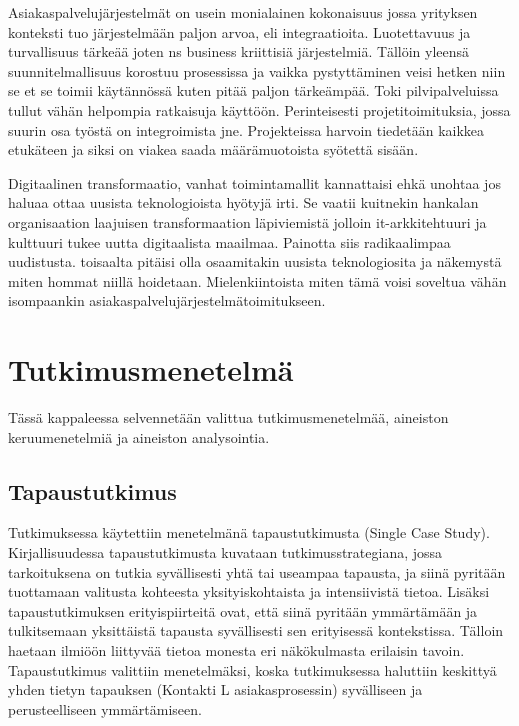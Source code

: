 \documentclass[finnish,12pt,a4paper,pdftex]{article}
\begin{document}
Asiakaspalvelujärjestelmät on usein monialainen kokonaisuus jossa yrityksen konteksti tuo järjestelmään paljon arvoa, eli integraatioita. Luotettavuus ja turvallisuus tärkeää joten ns business kriittisiä järjestelmiä. Tällöin yleensä suunnitelmallisuus korostuu prosessissa ja vaikka pystyttäminen veisi hetken niin se et se toimii käytännössä kuten pitää paljon tärkeämpää. Toki pilvipalveluissa tullut vähän helpompia ratkaisuja käyttöön. Perinteisesti projetitoimituksia, jossa suurin osa työstä on integroimista jne. Projekteissa harvoin tiedetään kaikkea etukäteen ja siksi on viakea saada määrämuotoista syötettä sisään.

Digitaalinen transformaatio, vanhat toimintamallit kannattaisi ehkä unohtaa jos haluaa ottaa uusista teknologioista hyötyjä irti. Se vaatii kuitnekin hankalan organisaation laajuisen transformaation läpiviemistä jolloin it-arkkitehtuuri ja kulttuuri tukee uutta digitaalista maailmaa. Painotta siis radikaalimpaa uudistusta. toisaalta pitäisi olla osaamitakin uusista teknologiosita ja näkemystä miten hommat niillä hoidetaan. Mielenkiintoista miten tämä voisi soveltua vähän isompaankin asiakaspalvelujärjestelmätoimitukseen.


\clearpage

\section{Tutkimusmenetelmä}

Tässä kappaleessa selvennetään valittua tutkimusmenetelmää, aineiston keruumenetelmiä ja aineiston analysointia. 

\subsection{Tapaustutkimus}
Tutkimuksessa käytettiin menetelmänä tapaustutkimusta (Single Case Study). Kirjallisuudessa tapaustutkimusta kuvataan tutkimusstrategiana, jossa tarkoituksena on tutkia syvällisesti yhtä tai useampaa tapausta, ja siinä pyritään tuottamaan valitusta kohteesta yksityiskohtaista ja intensiivistä tietoa.
Lisäksi tapaustutkimuksen erityispiirteitä ovat, että siinä pyritään ymmärtämään ja tulkitsemaan yksittäistä tapausta syvällisesti sen erityisessä kontekstissa. Tälloin haetaan ilmiöön liittyvää tietoa monesta eri näkökulmasta erilaisin tavoin. \citep{eskola} Tapaustutkimus valittiin menetelmäksi, koska tutkimuksessa haluttiin keskittyä yhden tietyn tapauksen (Kontakti L asiakasprosessin) syvälliseen ja perusteelliseen ymmärtämiseen. 
\end{document}
